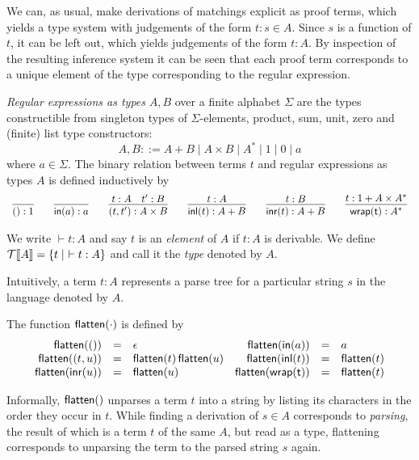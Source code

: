 We can, as usual, make derivations of matchings explicit as proof terms, which yields a type system with judgements of the form 
$t : s \in A$.  Since $s$ is a function of $t$, it can be left out, which yields judgements of the form $t : A$.  
By inspection of the resulting inference system it can be seen that each proof term corresponds to a unique element of the type corresponding to the regular expression.

\begin{definition}
\emph{Regular expressions as types} $A, B$ over a finite alphabet $\Sigma$ are the types constructible from singleton types of $\Sigma$-elements,
product, sum, unit, zero and (finite) list type constructors:
$$A, B ::= A + B \mid A \times B \mid A^* \mid 1 \mid 0 \mid a$$
where $a \in \Sigma$.
The binary relation between terms $t$ and regular expressions as types $A$ is defined inductively by
\[ \begin{array}{l}
\infer{\oft{()}{1}}{} \qquad 
\infer{\oft{\inj{a}}{a}}{} \qquad
\infer{\oft{\pair{t}{t'}}{A \times B}}{\oft{t}{A} & \oft{t'}{B}} \qquad 
\infer{\oft{\inl {t}}{A + B}}{\oft{t}{A}} \qquad
\infer{\oft{\inr {t}}{A + B}}{\oft{t}{B}}  \qquad
\infer{\oft{\fold{t}}{A^*}}{\oft{t}{1 + A \times A^*}}
\end{array} \]
\begin{proposition}
We write $\vdash t: A$ and say $t$ is an \emph{element} of $A$ if $t: A$ is derivable.
We define $\mathcal{T}\llbracket A \rrbracket = \{ t \mid \,\, \vdash t : A \}$ and call it the \emph{type} denoted by $A$.
\end{proposition}

\end{definition}

Intuitively, a term $t : A$ represents a parse tree for a particular string $s$ in the language denoted by $A$.
\begin{definition}
The function $\mathsf{flatten}(\cdot)$ is defined by
\[ \begin{array}{rclrcl}
\mathsf{flatten}(()) & = & \epsilon &
\mathsf{flatten}(\mathsf{in}(a)) & = & a \\
\mathsf{flatten}((t,u)) & = & \mathsf{flatten}(t) \, \mathsf{flatten}(u) &
\mathsf{flatten}(\mathsf{inl}(t)) & = & \mathsf{flatten}(t) \\
\mathsf{flatten}(\mathsf{inr}(u)) & = & \mathsf{flatten}(u) &
\mathsf{flatten}(\mathsf{wrap(t)}) & = & \mathsf{flatten}(t)
\end{array} \]
\end{definition}
Informally, $\mathsf{flatten}()$ unparses a term $t$ into a string by listing its characters in the order they occur in $t$. 
While finding a derivation of $s \in A$ corresponds to \emph{parsing}, the result of which is a term $t$ of the same $A$, but read as a type,
flattening corresponds to unparsing the term to the parsed string $s$ again.  

